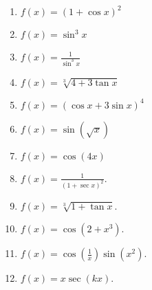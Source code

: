 \begin{multicols}{2}
\begin{enumerate}[ref={\fcProblemRef}]
\item \label{problemd/dx(1+cos(x))^2} $\displaystyle f(x)=(1+\cos x)^2$

\item $\displaystyle f(x)=\sin^3 x$

\item   $\displaystyle f(x)=\frac{1}{\sin^3x}$

\item  $\displaystyle f(x)= \sqrt[3]{4+3\tan x}$

\item  $f(x)=(\cos x + 3\sin x)^4$

\item \label{problemd/dx(sin(sqrt(x)))}  $f(x)=\sin\left(\sqrt{x}\right)$

\item  $f(x)=\cos(4x)$

\item $\displaystyle f(x)= \frac{1}{(1+\sec x)^2}$.

\item $\displaystyle f(x)= \sqrt[3]{1+\tan x}$.

\item $\displaystyle f(x)=\cos (2+x^3) $.

\item $\displaystyle f(x)=\cos \left(\frac{1}{x}\right) \sin (x^2)$.

\item $\displaystyle f(x)= x\sec (k x) $.


\end{enumerate}
\end{multicols}

